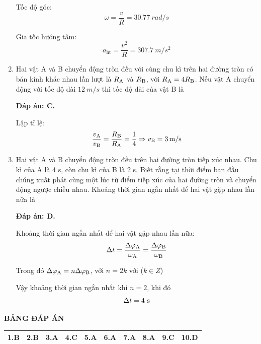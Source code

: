 \begin{enumerate}[label=\bfseries Câu \arabic*:]
{		Tốc độ góc:
		$$\omega = \dfrac{v}{R} = \SI{30.77}{rad/s}$$
		
		Gia tốc hướng tâm:
		$$a_\text{ht} = \dfrac{v^2}{R} = \SI{307.7}{m/s^2}$$
	}
	\item {}
	
	
	{
		Hai vật A và B chuyển động tròn đều với cùng chu kì trên hai đường tròn có bán kính khác nhau lần lượt là $R_\text A$ và $R_\text B$, với $R_\text A = 4 R_\text B$. Nếu vật A chuyển động với tốc độ dài $\SI{12}{m/s}$ thì tốc độ dài của vật B là
	}
	
	\hideall
	{	
		\textbf{Đáp án: C.}
		
		Lập tỉ lệ:
		$$\dfrac{v_\text A}{v_\text B} = \dfrac{R_\text B}{R_\text A} = \dfrac{1}{4} \Rightarrow v_\text B =\SI{3}{m/s} $$
	}
	\item {}
	
	
	{
		Hai vật A và B chuyển động tròn đều trên hai đường tròn tiếp xúc nhau. Chu kì của A là 4 s, còn chu kì của B là 2 s. Biết rằng tại thời điểm ban đầu chúng xuất phát cùng một lúc từ điểm tiếp xúc của hai đường tròn và chuyển động ngược chiều nhau. Khoảng thời gian ngắn nhất để hai vật gặp nhau lần nữa là
	}
	
	\hideall
	{	
		\textbf{Đáp án: D.}
		
		Khoảng thời gian ngắn nhất để hai vật gặp nhau lần nữa:
		$$\Delta t = \dfrac{\Delta \varphi_\text A }{\omega_\text A} = \dfrac{\Delta \varphi_\text B }{\omega_\text B}$$
		
		Trong đó $\Delta \varphi_\text A = n \Delta \varphi_\text B$, với $n=2k$ với ($k\in Z$)
		
		Vậy khoảng thời gian ngắn nhất khi $n=2$, khi đó $$\Delta t= 4\ \text s$$
	}
	
\end{enumerate}
\hideall
{
	\begin{center}
		\textbf{BẢNG ĐÁP ÁN}
	\end{center}
	\begin{center}
		\begin{tabular}{|m{2.8em}|m{2.8em}|m{2.8em}|m{2.8em}|m{2.8em}|m{2.8em}|m{2.8em}|m{2.8em}|m{2.8em}|m{2.8em}|}
			\hline
			1.B  & 2.B  & 3.A  & 4.C  & 5.A  & 6.A  & 7.A  & 8.A  & 9.C  & 10.D  \\
			\hline
			
		\end{tabular}
	\end{center}
}
